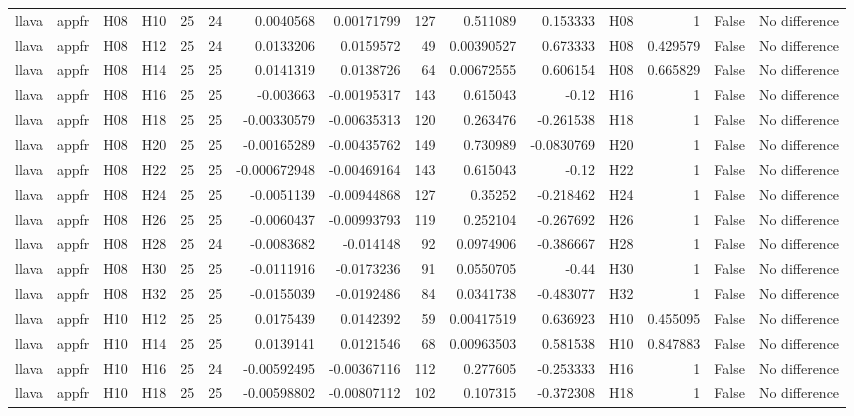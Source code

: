 \begin{longtable}{llllrrrrrrrlrrl}
llava & appfr & H08 & H10 & 25 & 24 & 0.0040568 & 0.00171799 & 127 & 0.511089 & 0.153333 & H08 & 1 & False & No difference \\
llava & appfr & H08 & H12 & 25 & 24 & 0.0133206 & 0.0159572 & 49 & 0.00390527 & 0.673333 & H08 & 0.429579 & False & No difference \\
llava & appfr & H08 & H14 & 25 & 25 & 0.0141319 & 0.0138726 & 64 & 0.00672555 & 0.606154 & H08 & 0.665829 & False & No difference \\
llava & appfr & H08 & H16 & 25 & 25 & -0.003663 & -0.00195317 & 143 & 0.615043 & -0.12 & H16 & 1 & False & No difference \\
llava & appfr & H08 & H18 & 25 & 25 & -0.00330579 & -0.00635313 & 120 & 0.263476 & -0.261538 & H18 & 1 & False & No difference \\
llava & appfr & H08 & H20 & 25 & 25 & -0.00165289 & -0.00435762 & 149 & 0.730989 & -0.0830769 & H20 & 1 & False & No difference \\
llava & appfr & H08 & H22 & 25 & 25 & -0.000672948 & -0.00469164 & 143 & 0.615043 & -0.12 & H22 & 1 & False & No difference \\
llava & appfr & H08 & H24 & 25 & 25 & -0.0051139 & -0.00944868 & 127 & 0.35252 & -0.218462 & H24 & 1 & False & No difference \\
llava & appfr & H08 & H26 & 25 & 25 & -0.0060437 & -0.00993793 & 119 & 0.252104 & -0.267692 & H26 & 1 & False & No difference \\
llava & appfr & H08 & H28 & 25 & 24 & -0.0083682 & -0.014148 & 92 & 0.0974906 & -0.386667 & H28 & 1 & False & No difference \\
llava & appfr & H08 & H30 & 25 & 25 & -0.0111916 & -0.0173236 & 91 & 0.0550705 & -0.44 & H30 & 1 & False & No difference \\
llava & appfr & H08 & H32 & 25 & 25 & -0.0155039 & -0.0192486 & 84 & 0.0341738 & -0.483077 & H32 & 1 & False & No difference \\
llava & appfr & H10 & H12 & 25 & 25 & 0.0175439 & 0.0142392 & 59 & 0.00417519 & 0.636923 & H10 & 0.455095 & False & No difference \\
llava & appfr & H10 & H14 & 25 & 25 & 0.0139141 & 0.0121546 & 68 & 0.00963503 & 0.581538 & H10 & 0.847883 & False & No difference \\
llava & appfr & H10 & H16 & 25 & 24 & -0.00592495 & -0.00367116 & 112 & 0.277605 & -0.253333 & H16 & 1 & False & No difference \\
llava & appfr & H10 & H18 & 25 & 25 & -0.00598802 & -0.00807112 & 102 & 0.107315 & -0.372308 & H18 & 1 & False & No difference \\

\end{longtable}
